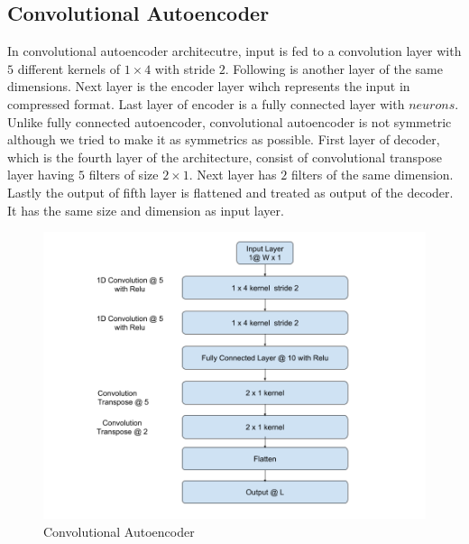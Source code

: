 \documentclass[12pt]{article}
\begin{document}
\subsection{Convolutional Autoencoder } 
In convolutional autoencoder architecutre, input is fed to a convolution layer with $5$ different kernels of $1 \times 4$ with stride $2$. Following is another layer of the same dimensions. Next layer is the encoder layer wihch represents the input in compressed format. Last layer of encoder is a fully connected layer with $neurons$. Unlike fully connected autoencoder, convolutional autoencoder is not symmetric although we tried to make it as symmetrics as possible. First layer of decoder, which is the fourth layer of the architecture, consist of convolutional transpose layer having $5$ filters of size $2 \times 1$. Next layer has $2$ filters of the same dimension. Lastly the output of fifth layer is flattened and treated as output of the decoder. It has the same size and dimension as input layer.
\begin{figure}[H]
\centering
        \includegraphics[width=\textwidth]{images/architecture/CnnAutoencoder.png}
    \caption{Convolutional Autoencoder}
    \label{cnnAutoencoder}
\end{figure}
\end{document}
